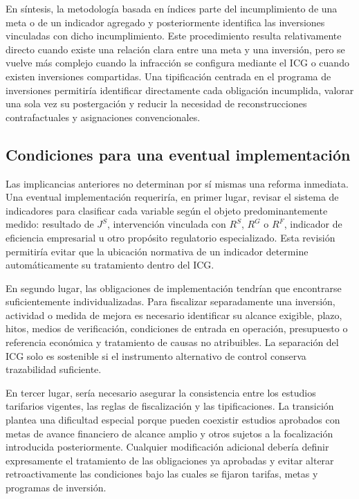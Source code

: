 En síntesis, la metodología basada en índices parte del incumplimiento de una meta o de un indicador agregado y posteriormente identifica las inversiones vinculadas con dicho incumplimiento. Este procedimiento resulta relativamente directo cuando existe una relación clara entre una meta y una inversión, pero se vuelve más complejo cuando la infracción se configura mediante el ICG o cuando existen inversiones compartidas. Una tipificación centrada en el programa de inversiones permitiría identificar directamente cada obligación incumplida, valorar una sola vez su postergación y reducir la necesidad de reconstrucciones contrafactuales y asignaciones convencionales.


\subsection{Condiciones para una eventual implementación}
\label{subsec:condiciones_eventual_implementacion}

Las implicancias anteriores no determinan por sí mismas una reforma inmediata. Una eventual implementación requeriría, en primer lugar, revisar el sistema de indicadores para clasificar cada variable según el objeto predominantemente medido: resultado de \(J^{S}\), intervención vinculada con \(R^{S}\), \(R^{G}\) o \(R^{F}\), indicador de eficiencia empresarial u otro propósito regulatorio especializado. Esta revisión permitiría evitar que la ubicación normativa de un indicador determine automáticamente su tratamiento dentro del ICG.

En segundo lugar, las obligaciones de implementación tendrían que encontrarse suficientemente individualizadas. Para fiscalizar separadamente una inversión, actividad o medida de mejora es necesario identificar su alcance exigible, plazo, hitos, medios de verificación, condiciones de entrada en operación, presupuesto o referencia económica y tratamiento de causas no atribuibles. La separación del ICG solo es sostenible si el instrumento alternativo de control conserva trazabilidad suficiente.

En tercer lugar, sería necesario asegurar la consistencia entre los estudios tarifarios vigentes, las reglas de fiscalización y las tipificaciones. La transición plantea una dificultad especial porque pueden coexistir estudios aprobados con metas de avance financiero de alcance amplio y otros sujetos a la focalización introducida posteriormente. Cualquier modificación adicional debería definir expresamente el tratamiento de las obligaciones ya aprobadas y evitar alterar retroactivamente las condiciones bajo las cuales se fijaron tarifas, metas y programas de inversión.

